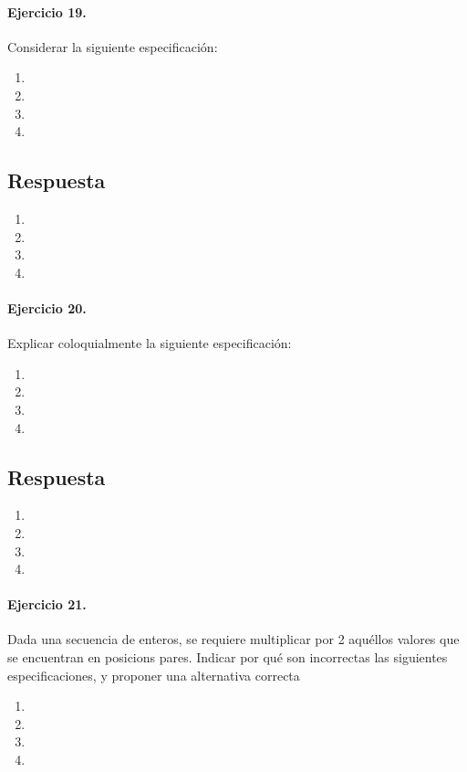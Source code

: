 \documentclass[a4paper]{article}
\begin{document}
\paragraph*{Ejercicio 19.} Considerar la siguiente especificación:
	\begin{enumerate}[label=\alph*)]
		\item
		\item
		\item
		\item
	\end{enumerate}
\subsection*{Respuesta}
	\begin{enumerate}[label=\alph*)]
		\item
		\item
		\item
		\item
	\end{enumerate}
	
\paragraph*{Ejercicio 20.} Explicar coloquialmente la siguiente especificación:
	\begin{enumerate}[label=\alph*)]
		\item
		\item
		\item
		\item
	\end{enumerate}
\subsection*{Respuesta}
	\begin{enumerate}[label=\alph*)]
		\item
		\item
		\item
		\item
	\end{enumerate}
	
\paragraph*{Ejercicio 21.} Dada una secuencia de enteros, se requiere multiplicar por 2 aquéllos valores que se encuentran en posicions pares. Indicar por qué son incorrectas las siguientes especificaciones, y proponer una alternativa correcta
	\begin{enumerate}[label=\alph*)]
		\item
		\item
		\item
		\item
	\end{enumerate}
\end{document}
